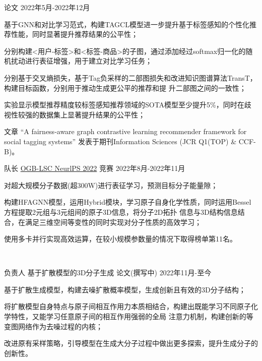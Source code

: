 \begin{cventries}
  {论文} %
  {2022年5月-2022年12月} %
  {
    \begin{cvitems} %
      \item {基于GNN和对比学习范式，构建TAGCL模型进一步提升基于标签感知的个性化推荐性能，同时显著提升推荐结果的公平性；}
      \item {分别构建<用户-标签>和<标签-商品>的子图，通过添加经过softmax归一化的随机扰动进行表征增强，用于建立对比学习任务；}
      \item {分别基于交叉熵损失，基于Tag负采样的二部图损失和改进知识图谱算法TransT，构建目标函数，分别用于推动生成更公平的推荐和提
      升二部图之间的一致性；}
      \item {实验显示模型推荐精度较标签感知推荐领域的SOTA模型至少提升5\%，同时在歧视性较强的数据集上显著提升结果的公平性；}
      \item {文章 “A fairness-aware graph contrastive learning recommender framework for social tagging systems” 发表于期刊Information Sciences (JCR Q1(TOP) \& CCF-B)。}
    \end{cvitems}
  }
  
\cventry
  {队长} %
  {\href{https://ogb.stanford.edu/neurips2022/results/}{OGB-LSC NeurlPS 2022}} %
  {竞赛} %
  {2022年8月-2022年11月} %
  {
    \begin{cvitems} %
      \item {对超大规模分子数据(超300W)进行表征学习，预测目标分子能量隙；}
      \item {构建HFAGNN模型，运用Hybrid模块，学习原子自身化学性质，同时运用Bessel方程提取2元组与3元组间的原子3D信息，将分子2D拓扑
      信息与3D结构信息结合，在满足三维空间等变性的同时实现对分子性质的高效学习；}
      \item {使用多卡并行实现高效运算，在较小规模参数量的情况下取得榜单第11名。}
    \end{cvitems}
  }

\

\cventry
  {负责人} %
  {基于扩散模型的3D分子生成} %
  {论文(撰写中)} %
  {2022年11月-至今} %
  {
    \begin{cvitems} 
      \item {基于扩散生成模型，构建去噪扩散概率模型，生成创新且有效的3D分子结构；}
      \item {将扩散模型自身特点与原子间相互作用力本质相结合，构建出既能学习不同原子化学特性，又能学习任意原子间的相互作用强弱的全局
      注意力机制，构建创新的等变图网络作为去噪过程的内核；}
      \item {改进原有采样策略，引导模型在生成大分子过程中做出更多探索，提升生成分子的创新性。}
    \end{cvitems}
  }


\end{cventries}
